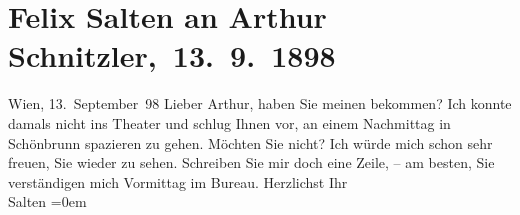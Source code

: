 

         
         \renewcommand{\erwaehntePersonen}{Personen: Felix Salten}
         \renewcommand{\erwaehnteInstitutionen}{Institutionen: Wiener Allgemeine Zeitung}
         \renewcommand{\erwaehnteOrte}{Orte: Schlosspark Schönbrunn, Wien}
         \renewcommand{\erwaehnteWerke}{}
               \section[ Felix Salten an Arthur Schnitzler, 13. 9. 1898]{ Felix Salten an Arthur Schnitzler, 13. 9. 1898}\nopagebreak{}\rehead{ }\begin{ledgroupsized}[t]{13cm}\normalsize\beginnumbering{} \toendnotes[C]{\smallbreak\pagebreak[2]} 
\toendnotes[C]{\smallbreak}\pstart
           \raggedleft{}{\pb}Wien, 13. September 98\pend
           \pstart
           Lieber Arthur, haben Sie meinen \label{K_L03283-1v}\label{K_L03283-1h} bekommen? Ich konnte damals nicht ins Theater und schlug Ihnen vor, an einem
               Nachmittag in Schönbrunn spazieren zu gehen.
               Möchten Sie nicht? Ich würde mich schon sehr freuen, Sie wieder zu sehen. Schreiben
               Sie mir doch eine Zeile, – am besten, Sie verständigen mich Vormittag im
                  Bureau.\pend
           \pstart
           Herzlichst Ihr {\\[\baselineskip]}\spacefill\mbox{Salten}\pend
           \leftskip=0em{}
         
         \endnumbering{}\end{ledgroupsized}  \newcommand{\dateiname}{L03283}\newcommand{\titel}{Felix Salten an Arthur Schnitzler, 13. 9. 1898}\newcommand{\editorInnen}{Martin Anton Müller und Laura Untner}
      